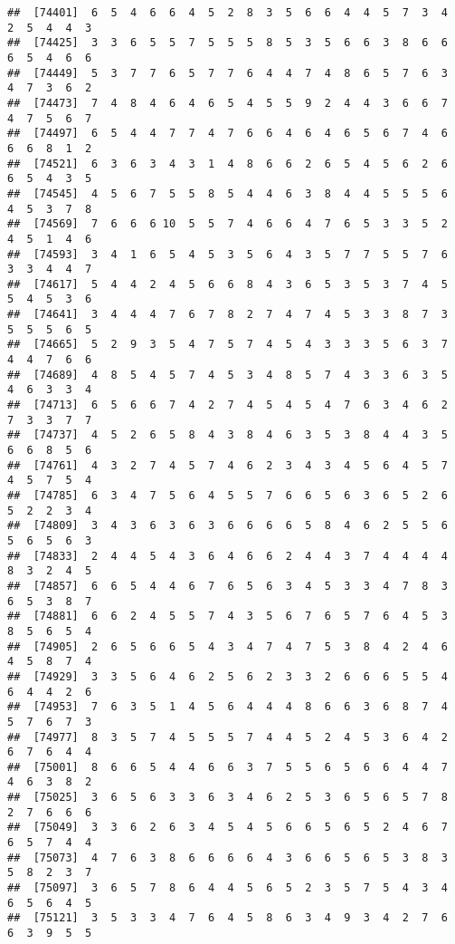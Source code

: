 \documentclass[
]{book}
\begin{document}
\begin{verbatim}
##  [74401]  6  5  4  6  6  4  5  2  8  3  5  6  6  4  4  5  7  3  4  2  5  4  4  3
##  [74425]  3  3  6  5  5  7  5  5  5  8  5  3  5  6  6  3  8  6  6  6  5  4  6  6
##  [74449]  5  3  7  7  6  5  7  7  6  4  4  7  4  8  6  5  7  6  3  4  7  3  6  2
##  [74473]  7  4  8  4  6  4  6  5  4  5  5  9  2  4  4  3  6  6  7  4  7  5  6  7
##  [74497]  6  5  4  4  7  7  4  7  6  6  4  6  4  6  5  6  7  4  6  6  6  8  1  2
##  [74521]  6  3  6  3  4  3  1  4  8  6  6  2  6  5  4  5  6  2  6  6  5  4  3  5
##  [74545]  4  5  6  7  5  5  8  5  4  4  6  3  8  4  4  5  5  5  6  4  5  3  7  8
##  [74569]  7  6  6  6 10  5  5  7  4  6  6  4  7  6  5  3  3  5  2  4  5  1  4  6
##  [74593]  3  4  1  6  5  4  5  3  5  6  4  3  5  7  7  5  5  7  6  3  3  4  4  7
##  [74617]  5  4  4  2  4  5  6  6  8  4  3  6  5  3  5  3  7  4  5  5  4  5  3  6
##  [74641]  3  4  4  4  7  6  7  8  2  7  4  7  4  5  3  3  8  7  3  5  5  5  6  5
##  [74665]  5  2  9  3  5  4  7  5  7  4  5  4  3  3  3  5  6  3  7  4  4  7  6  6
##  [74689]  4  8  5  4  5  7  4  5  3  4  8  5  7  4  3  3  6  3  5  4  6  3  3  4
##  [74713]  6  5  6  6  7  4  2  7  4  5  4  5  4  7  6  3  4  6  2  7  3  3  7  7
##  [74737]  4  5  2  6  5  8  4  3  8  4  6  3  5  3  8  4  4  3  5  6  6  8  5  6
##  [74761]  4  3  2  7  4  5  7  4  6  2  3  4  3  4  5  6  4  5  7  4  5  7  5  4
##  [74785]  6  3  4  7  5  6  4  5  5  7  6  6  5  6  3  6  5  2  6  5  2  2  3  4
##  [74809]  3  4  3  6  3  6  3  6  6  6  6  5  8  4  6  2  5  5  6  5  6  5  6  3
##  [74833]  2  4  4  5  4  3  6  4  6  6  2  4  4  3  7  4  4  4  4  8  3  2  4  5
##  [74857]  6  6  5  4  4  6  7  6  5  6  3  4  5  3  3  4  7  8  3  6  5  3  8  7
##  [74881]  6  6  2  4  5  5  7  4  3  5  6  7  6  5  7  6  4  5  3  8  5  6  5  4
##  [74905]  2  6  5  6  6  5  4  3  4  7  4  7  5  3  8  4  2  4  6  4  5  8  7  4
##  [74929]  3  3  5  6  4  6  2  5  6  2  3  3  2  6  6  6  5  5  4  6  4  4  2  6
##  [74953]  7  6  3  5  1  4  5  6  4  4  4  8  6  6  3  6  8  7  4  5  7  6  7  3
##  [74977]  8  3  5  7  4  5  5  5  7  4  4  5  2  4  5  3  6  4  2  6  7  6  4  4
##  [75001]  8  6  6  5  4  4  6  6  3  7  5  5  6  5  6  6  4  4  7  4  6  3  8  2
##  [75025]  3  6  5  6  3  3  6  3  4  6  2  5  3  6  5  6  5  7  8  2  7  6  6  6
##  [75049]  3  3  6  2  6  3  4  5  4  5  6  6  5  6  5  2  4  6  7  6  5  7  4  4
##  [75073]  4  7  6  3  8  6  6  6  6  4  3  6  6  5  6  5  3  8  3  5  8  2  3  7
##  [75097]  3  6  5  7  8  6  4  4  5  6  5  2  3  5  7  5  4  3  4  6  5  6  4  5
##  [75121]  3  5  3  3  4  7  6  4  5  8  6  3  4  9  3  4  2  7  6  6  3  9  5  5

\end{verbatim}
\end{document}
